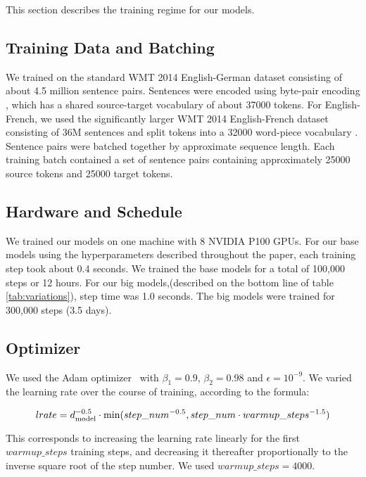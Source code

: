 This section describes the training regime for our models.


\subsection{Training Data and Batching}
We trained on the standard WMT 2014 English-German dataset consisting of about
4.5 million sentence pairs.  Sentences were encoded using byte-pair encoding
\citep{DBLP:journals/corr/BritzGLL17}, which has a shared source-target
vocabulary of about 37000 tokens. For English-French, we used the significantly
larger WMT 2014 English-French dataset consisting of 36M sentences and split
tokens into a 32000 word-piece vocabulary \citep{wu2016google}.  Sentence pairs
were batched together by approximate sequence length.  Each training batch
contained a set of sentence pairs containing approximately 25000 source tokens
and 25000 target tokens.

\subsection{Hardware and Schedule}

We trained our models on one machine with 8 NVIDIA P100 GPUs.  For our base
models using the hyperparameters described throughout the paper, each training
step took about 0.4 seconds.  We trained the base models for a total of 100,000
steps or 12 hours.  For our big models,(described on the bottom line of table
\ref{tab:variations}), step time was 1.0 seconds.  The big models were trained
for 300,000 steps (3.5 days).

\subsection{Optimizer} We used the Adam optimizer~\citep{kingma2014adam} with
$\beta_1=0.9$, $\beta_2=0.98$ and $\epsilon=10^{-9}$.  We varied the learning
rate over the course of training, according to the formula:

\begin{equation}
  lrate = d_{\text{model}}^{-0.5} \cdot
  \min({step\_num}^{-0.5},
  {step\_num} \cdot {warmup\_steps}^{-1.5})
\end{equation}

This corresponds to increasing the learning rate linearly for the first
$warmup\_steps$ training steps, and decreasing it thereafter proportionally to
the inverse square root of the step number.  We used $warmup\_steps=4000$.

